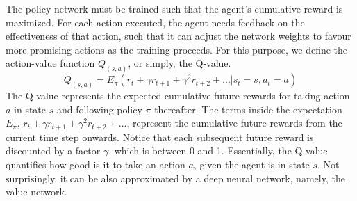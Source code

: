 \documentclass[conference]{IEEEtran}
\begin{document}
The policy network must be trained such that the agent's cumulative reward is maximized. For each action executed, the agent needs feedback on the effectiveness of that action, such that it can adjust the network weights to favour more promising actions as the training proceeds. For this purpose, we define the action-value function $Q_{(s,a)}$, or simply, the Q-value.
\begin{equation} \label{eq:q}
    Q_{(s,a)} = E_{\pi}(r_{t}+\gamma r_{t+1}+\gamma^2 r_{t+2}+...|s_{t} = s, a_{t} = a)
\end{equation}
The Q-value represents the expected cumulative future rewards for taking action $a$ in state $s$ and following policy $\pi$ thereafter. The terms inside the expectation $E_{\pi}$, $r_{t}+\gamma r_{t+1}+\gamma^2 r_{t+2}+...$, represent
the cumulative future rewards from the current time step onwards. Notice that each subsequent future reward is discounted by a factor $\gamma$, which is between 0 and 1. Essentially, the Q-value quantifies how good is it to take an action $a$, given the agent is in state $s$. Not surprisingly, it can be also approximated by a deep neural network, namely, the value network.
\end{document}
